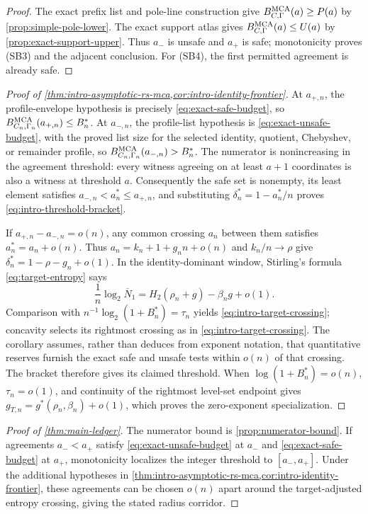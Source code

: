 \documentclass[12pt,a4paper]{amsart}
\numberwithin{equation}{section}
\theoremstyle{remark}
\newcommand{\barN}{\overline N}
\begin{document}
\begin{proof}
The exact prefix list and pole-line construction give
\(B_{C,\Gamma}^{\rm MCA}(a)\ge P(a)\) by
\cref{prop:simple-pole-lower}.  The exact support atlas gives
\(B_{C,\Gamma}^{\rm MCA}(a)\le U(a)\) by
\cref{prop:exact-support-upper}.  Thus \(a_-\) is unsafe and \(a_+\) is
safe; monotonicity proves \textup{(SB3)} and the adjacent conclusion.
For \textup{(SB4)}, the first permitted agreement is already safe.
\end{proof}

\begin{proof}[Proof of
\cref{thm:intro-asymptotic-rs-mca,cor:intro-identity-frontier}]
At \(a_{+,n}\), the profile-envelope hypothesis is precisely
\eqref{eq:exact-safe-budget}, so
\(B_{C_n,\Gamma_n}^{\rm MCA}(a_{+,n})\le B_n^*\).  At
\(a_{-,n}\), the profile-list hypothesis is
\eqref{eq:exact-unsafe-budget}, with the proved list size for the selected
identity, quotient, Chebyshev, or remainder profile, so
\(B_{C_n,\Gamma_n}^{\rm MCA}(a_{-,n})>B_n^*\).  The numerator is
nonincreasing in the agreement threshold: every witness agreeing on at
least \(a+1\) coordinates is also a witness at threshold \(a\).
Consequently the safe set is nonempty, its least element satisfies
\(a_{-,n}<a_n^*\le a_{+,n}\), and substituting
\(\delta_n^*=1-a_n^*/n\) proves
\eqref{eq:intro-threshold-bracket}.

If \(a_{+,n}-a_{-,n}=o(n)\), any common crossing \(a_n\) between them
satisfies \(a_n^*=a_n+o(n)\).  Thus
\(a_n=k_n+1+g_nn+o(n)\) and \(k_n/n\to\rho\) give
\(\delta_n^*=1-\rho-g_n+o(1)\).  In the identity-dominant window,
Stirling's formula \eqref{eq:target-entropy} says
\[
 \frac1n\log_2\barN_1
 =H_2(\rho_n+g)-\beta_ng+o(1).
\]
Comparison with \(n^{-1}\log_2(1+B_n^*)=\tau_n\) yields
\eqref{eq:intro-target-crossing}; concavity selects its rightmost crossing
as in \eqref{eq:intro-target-crossing}.  The corollary assumes, rather than
deduces from exponent notation, that quantitative reserves furnish the
exact safe and unsafe tests within \(o(n)\) of that crossing.  The bracket
therefore gives its claimed threshold.  When
\(\log(1+B_n^*)=o(n)\), \(\tau_n=o(1)\), and continuity of the rightmost
level-set endpoint gives
\(g_{T,n}=g^*(\rho_n,\beta_n)+o(1)\), which proves the zero-exponent
specialization.
\end{proof}

\begin{proof}[Proof of \cref{thm:main-ledger}]
The numerator bound is \cref{prop:numerator-bound}.  If agreements
\(a_-<a_+\) satisfy \eqref{eq:exact-unsafe-budget} at \(a_-\) and
\eqref{eq:exact-safe-budget} at \(a_+\), monotonicity localizes the integer
threshold to \([a_-,a_+]\).  Under the additional hypotheses in
\cref{thm:intro-asymptotic-rs-mca,cor:intro-identity-frontier}, these
agreements can be chosen \(o(n)\) apart around the target-adjusted entropy
crossing, giving the stated radius corridor.
\end{proof}
\end{document}
